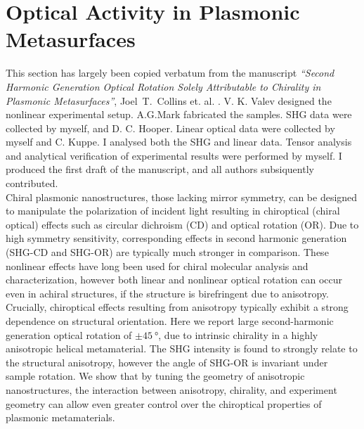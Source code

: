 \chapter{Optical Activity in Plasmonic Metasurfaces}\label{sec:results:OAinPlanarNanohelices}

This section has largely been copied verbatum from the manuscript \textit{``Second Harmonic Generation Optical Rotation Solely Attributable to Chirality in Plasmonic Metasurfaces''}, Joel~T.~Collins et. al. \cite{Collins2018b}. 
V. K. Valev designed the nonlinear experimental setup. A.G.Mark fabricated the samples. SHG data were collected by myself, and D. C. Hooper. Linear optical data were collected by myself and C. Kuppe. I analysed both the SHG and linear data. Tensor analysis and analytical verification of experimental results were performed by myself. I produced the first draft of the manuscript, and all authors subsiquently contributed.
\\

Chiral plasmonic nanostructures, those lacking mirror symmetry, can be designed to manipulate the polarization of incident light resulting in chiroptical (chiral optical) effects such as circular dichroism (CD) and optical rotation (OR). Due to high symmetry sensitivity, corresponding effects in second harmonic generation (SHG-CD and SHG-OR) are typically much stronger in comparison. These nonlinear effects have long been used for chiral molecular analysis and characterization, however both linear and nonlinear optical rotation can occur even in achiral structures, if the structure is birefringent due to anisotropy. Crucially, chiroptical effects resulting from anisotropy typically exhibit a strong dependence on structural orientation. Here we report large second-harmonic generation optical rotation of $\pm\SI{45}{\degree}$, due to intrinsic chirality in a highly anisotropic helical metamaterial. The SHG intensity is found to strongly relate to the structural anisotropy, however the angle of SHG-OR is invariant under sample rotation. We show that by tuning the geometry of anisotropic nanostructures, the interaction between anisotropy, chirality, and experiment geometry can allow even greater control over the chiroptical properties of plasmonic metamaterials.

